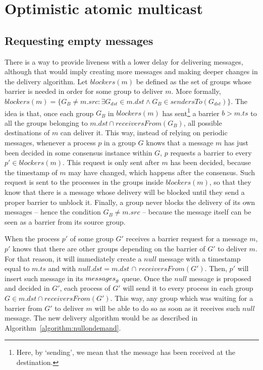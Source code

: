 \documentclass[times, 10pt]{article}
\begin{document}
\section{Optimistic atomic multicast}
\label{sec:optimized}


\subsection{Requesting empty messages}
\label{sec:nullondemand}

There is a way to provide liveness with a lower delay for delivering messages, although that would imply creating more messages and making deeper changes in the delivery algorithm. Let $blockers(m)$ be defined as the set of groups whose barrier is needed in order for some group to deliver $m$. More formally, \mbox{$blockers(m) = \{G_B \neq m.src : \exists G_{dst} \in m.dst \wedge G_B \in sendersTo(G_{dst})\}$}. The idea is that, once each group $G_B$ in $blockers(m)$ has sent\footnote{Here, by `sending', we mean that the message has been received at the destination.} a barrier $b > m.ts$ to all the groups belonging to \mbox{$m.dst \cap receiversFrom(G_B)$}, all possible destinations of $m$ can deliver it. This way, instead of relying on periodic messages, whenever a process $p$ in a group $G$ knows that a message $m$ has just been decided in some consensus instance within $G$, $p$ requests a barrier to every $p' \in blockers(m)$. This request is only sent after $m$ has been decided, because the timestamp of $m$ may have changed, which happens after the consensus. Such request is sent to the processes in the groups inside $blockers(m)$, so that they know that there is a message whose delivery will be blocked until they send a proper barrier to unblock it. Finally, a group never blocks the delivery of its own messages -- hence the condition $G_B \neq m.src$ -- because the message itself can be seen as a barrier from its source group.

When the process $p'$ of some group $G'$ receives a barrier request for a message $m$, %
$p'$ knows that there are other groups depending on the barrier of $G'$ to deliver $m$. For that reason, it will immediately create a $null$ message with a timestamp equal to $m.ts$ and with $null.dst = m.dst$ $\cap$ $receiversFrom(G')$. Then, $p'$ will insert such message in its %
$messages\text{$_g$}$ queue. %
Once the $null$ message is proposed and decided in $G'$, each process of $G'$ will send it to every process in each group \mbox{$G \in m.dst \cap receiversFrom(G')$}. This way, any group which was waiting for a barrier from $G'$ to deliver $m$ will be able to do so as soon as it receives such $null$ message. The new delivery algorithm would be as described in \mbox{Algorithm {\ref{algorithm:nullondemand}}}.
\end{document}
